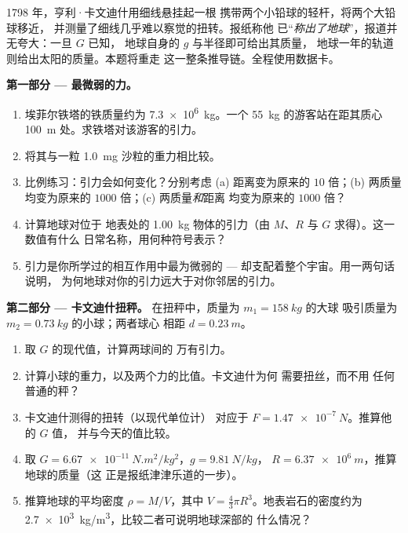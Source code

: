 \begin{problem}
\label{pb:g10:universal-gravitation:1}
1798 年，亨利·卡文迪什用细线悬挂起一根
携带两个小铅球的轻杆，将两个大铅球移近，
并测量了细线几乎难以察觉的扭转。报纸称他
已“\emph{称出了地球}”，报道并无夸大：一旦 $G$ 已知，
地球自身的 $g$ 与半径即可给出其质量，
地球一年的轨道则给出太阳的质量。本题将重走
这一整条推导链。全程使用数据卡。

\medskip
\noindent\textbf{第一部分 --- 最微弱的力。}
\begin{enumerate}
  \item 埃菲尔铁塔的铁质量约为 \qty{7.3e6}{kg}。一个
        \qty{55}{kg} 的游客站在距其质心 \qty{100}{m}
        处。求铁塔对该游客的引力。
  \item 将其与一粒 \qty{1.0}{mg} 沙粒的重力相比较。
  \item 比例练习：引力会如何变化？分别考虑
        (a) 距离变为原来的 $10$ 倍；(b) 两质量
        均变为原来的 $1000$ 倍；(c) 两质量\emph{和}距离
        均变为原来的 $1000$ 倍？
  \item 计算地球对位于
        地表处的 \qty{1.00}{kg} 物体的引力（由 $M$、$R$ 与 $G$ 求得）。这一数值有什么
        日常名称，用何种符号表示？
  \item 引力是你所学过的相互作用中最为微弱的 ---
        却支配着整个宇宙。用一两句话说明，
        为何地球对你的引力远大于对你邻居的引力。
\end{enumerate}

\medskip
\noindent\textbf{第二部分 --- 卡文迪什扭秤。}
在扭秤中，质量为 $m_1 = \qty{158}{kg}$ 的大球
吸引质量为 $m_2 = \qty{0.73}{kg}$ 的小球；两者球心
相距 $d = \qty{0.23}{m}$。
\begin{enumerate}[resume]
  \item 取 $G$ 的现代值，计算两球间的
        万有引力。
  \item 计算小球的重力，以及两个力的比值。卡文迪什为何
        需要扭丝，而不用
        任何普通的秤？
  \item 卡文迪什测得的扭转（以现代单位计）
        对应于 $F = \qty{1.47e-7}{N}$。推算他的 $G$ 值，
        并与今天的值比较。
  \item 取 $G = \qty{6.67e-11}{N.m^2/kg^2}$，$g = \qty{9.81}{N/kg}$，
        $R = \qty{6.37e6}{m}$，推算地球的质量（这
        正是报纸津津乐道的一步）。
  \item 推算地球的平均密度 $\rho = M / V$，其中
        $V = \frac43 \pi R^3$。地表岩石的密度约为
        \qty{2.7e3}{kg/m^3}，比较二者可说明地球深部的
        什么情况？
\end{enumerate}


\end{problem}
